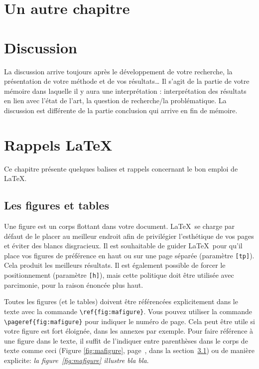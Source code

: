 \documentclass[a4paper,11pt]{book}
\begin{document}
\chapter{Un autre chapitre}

\lipsum[1-40]

\chapter{Discussion}

La discussion arrive toujours après le développement de votre
recherche, la présentation de votre méthode et de vos résultats… Il
s'agit de la partie de votre mémoire dans laquelle il y aura une
interprétation : interprétation des résultats en lien avec l'état de
l'art, la question de recherche/la problématique. La discussion est
différente de la partie conclusion qui arrive en fin de mémoire.

\chapter{Rappels \texorpdfstring{\LaTeX}{LaTeX}}

Ce chapitre présente quelques balises et rappels concernant le bon emploi de \LaTeX.

\section{Les figures et tables}
\label{sec:figandtab}

Une figure est un corps flottant dans votre document. \LaTeX\ se
charge par défaut de le placer au meilleur endroit afin de privilégier
l'esthétique de vos pages et éviter des blancs disgracieux. Il est
souhaitable de guider \LaTeX\ pour qu'il place vos figures de
préférence en haut ou sur une page séparée (paramètre
\texttt{[tp]}). Cela produit les meilleurs résultats. Il est également
possible de forcer le positionnement (paramètre \texttt{[h]}), mais
cette politique doit être utilisée avec parcimonie, pour la raison
énoncée plus haut.

Toutes les figures (et le tables) doivent être référencées
explicitement dans le texte avec la commande
\verb+\ref{fig:mafigure}+. Vous pouvez utiliser la commande
\verb+\pageref{fig:mafigure}+ pour indiquer le numéro de page. Cela
peut être utile si votre figure est fort éloignée, dans les annexes
par exemple.  Pour faire référence à une figure dans le texte, il
suffit de l'indiquer entre parenthèses dans le corps de texte comme
ceci (Figure \ref{fig:mafigure}, page~\pageref{fig:mafigure}, dans la
section~\ref{sec:figandtab}) ou de manière explicite: \textit{la
  figure~\ref{fig:mafigure} illustre bla bla}.
\end{document}
